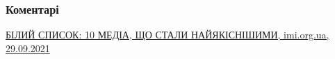  
 
 
 
 
\subsubsection{Коментарі}

\begin{itemize} %

\href{https://imi.org.ua/monitorings/bilyj-spysok-10-media-shho-staly-najyakisnishymy-i41541}{%
БІЛИЙ СПИСОК: 10 МЕДІА, ЩО СТАЛИ НАЙЯКІСНІШИМИ, imi.org.ua, 29.09.2021%
}



\end{itemize} %
